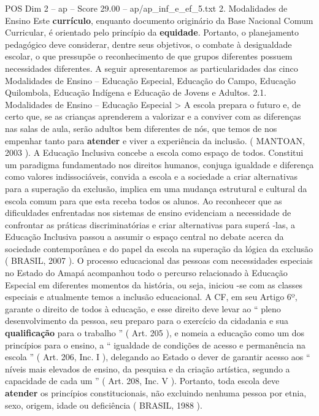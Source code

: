 \begin{textsample}{POS Dim 2 – ap – Score 29.00 – ap/ap\_inf\_e\_ef\_5.txt}  \label{ex:f2_pos_143}
2.
Modalidades de Ensino Este \textbf{currículo}, enquanto documento originário da Base Nacional Comum Curricular, é orientado pelo princípio da \textbf{equidade}.
Portanto, o planejamento pedagógico deve considerar, dentre seus objetivos, o combate à desigualdade escolar, o que pressupõe o reconhecimento de que grupos diferentes possuem necessidades diferentes.
A seguir apresentaremos as particularidades das cinco Modalidades de Ensino – Educação Especial, Educação do Campo, Educação Quilombola, Educação Indígena e Educação de Jovens e Adultos. 2.1.
Modalidades de Ensino – Educação Especial > A escola prepara o futuro e, de certo que, se as crianças aprenderem a valorizar e a conviver com as diferenças nas salas de aula, serão adultos bem diferentes de nós, que temos de nos empenhar tanto para \textbf{atender} e viver a experiência da inclusão. ( MANTOAN, 2003 ).
A Educação Inclusiva concebe a escola como espaço de todos.
Constitui um paradigma fundamentado nos direitos humanos, conjuga igualdade e diferença como valores indissociáveis, convida a escola e a sociedade a criar alternativas para a superação da exclusão, implica em uma mudança estrutural e cultural da escola comum para que esta receba todos os alunos.
Ao reconhecer que as dificuldades enfrentadas nos sistemas de ensino evidenciam a necessidade de confrontar as práticas discriminatórias e criar alternativas para superá -las, a Educação Inclusiva passou a assumir o espaço central no debate acerca da sociedade contemporânea e do papel da escola na superação da lógica da exclusão ( BRASIL, 2007 ).
O processo educacional das pessoas com necessidades especiais no Estado do Amapá acompanhou todo o percurso relacionado à Educação Especial em diferentes momentos da história, ou seja, iniciou -se com as classes especiais e atualmente temos a inclusão educacional.
A CF, em seu Artigo 6º, garante o direito de todos à educação, e esse direito deve levar ao “ pleno desenvolvimento da pessoa, seu preparo para o exercício da cidadania e sua \textbf{qualificação} para o trabalho ” ( Art. 205 ), e nomeia a educação como um dos princípios para o ensino, a “ igualdade de condições de acesso e permanência na escola ” ( Art. 206, Inc.
I ), delegando ao Estado o dever de garantir acesso aos “ níveis mais elevados de ensino, da pesquisa e da criação artística, segundo a capacidade de cada um ” ( Art. 208, Inc.
V ).
Portanto, toda escola deve \textbf{atender} os princípios constitucionais, não excluindo nenhuma pessoa por etnia, sexo, origem, idade ou deficiência ( BRASIL, 1988 ).

\end{textsample}
